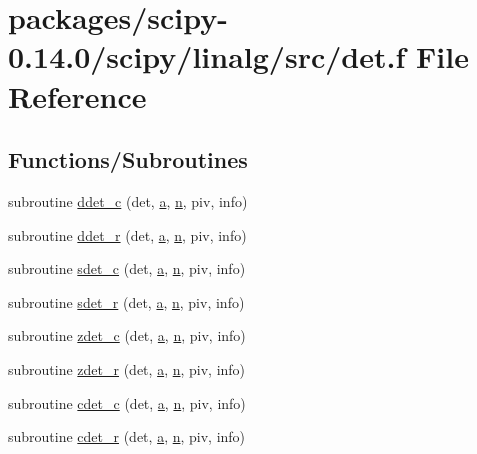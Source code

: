 \hypertarget{det_8f}{}\section{packages/scipy-\/0.14.0/scipy/linalg/src/det.f File Reference}
\label{det_8f}
\subsection*{Functions/\+Subroutines}
\begin{DoxyCompactItemize}
\item 
subroutine \hyperlink{det_8f_a9c5b31ebc2095b6a63e3842485110297}{ddet\+\_\+c} (det, \hyperlink{gen__mat5files_8m_aae328bf20413f220e38aec4d95bfd6da}{a}, \hyperlink{indexexpr_8h_ab427e2e2b4d6cec55fa088ea2a692ace}{n}, piv, info)
\item 
subroutine \hyperlink{det_8f_a9ae44e978dcb8b43668795829d365564}{ddet\+\_\+r} (det, \hyperlink{gen__mat5files_8m_aae328bf20413f220e38aec4d95bfd6da}{a}, \hyperlink{indexexpr_8h_ab427e2e2b4d6cec55fa088ea2a692ace}{n}, piv, info)
\item 
subroutine \hyperlink{det_8f_af929ac544480a9a70b93c29e0df6eb5a}{sdet\+\_\+c} (det, \hyperlink{gen__mat5files_8m_aae328bf20413f220e38aec4d95bfd6da}{a}, \hyperlink{indexexpr_8h_ab427e2e2b4d6cec55fa088ea2a692ace}{n}, piv, info)
\item 
subroutine \hyperlink{det_8f_acce07756420cde489220696face2fa83}{sdet\+\_\+r} (det, \hyperlink{gen__mat5files_8m_aae328bf20413f220e38aec4d95bfd6da}{a}, \hyperlink{indexexpr_8h_ab427e2e2b4d6cec55fa088ea2a692ace}{n}, piv, info)
\item 
subroutine \hyperlink{det_8f_ac18c3adbbc9fb90c4169799a4a0fd720}{zdet\+\_\+c} (det, \hyperlink{gen__mat5files_8m_aae328bf20413f220e38aec4d95bfd6da}{a}, \hyperlink{indexexpr_8h_ab427e2e2b4d6cec55fa088ea2a692ace}{n}, piv, info)
\item 
subroutine \hyperlink{det_8f_aa9807524b3234f9025f4b530129c328f}{zdet\+\_\+r} (det, \hyperlink{gen__mat5files_8m_aae328bf20413f220e38aec4d95bfd6da}{a}, \hyperlink{indexexpr_8h_ab427e2e2b4d6cec55fa088ea2a692ace}{n}, piv, info)
\item 
subroutine \hyperlink{det_8f_a94176fbcac5ce1a4279c90957a0d3b3b}{cdet\+\_\+c} (det, \hyperlink{gen__mat5files_8m_aae328bf20413f220e38aec4d95bfd6da}{a}, \hyperlink{indexexpr_8h_ab427e2e2b4d6cec55fa088ea2a692ace}{n}, piv, info)
\item 
subroutine \hyperlink{det_8f_a1bed80dbde0e2cb539189fd3ada74f33}{cdet\+\_\+r} (det, \hyperlink{gen__mat5files_8m_aae328bf20413f220e38aec4d95bfd6da}{a}, \hyperlink{indexexpr_8h_ab427e2e2b4d6cec55fa088ea2a692ace}{n}, piv, info)
\end{DoxyCompactItemize}


